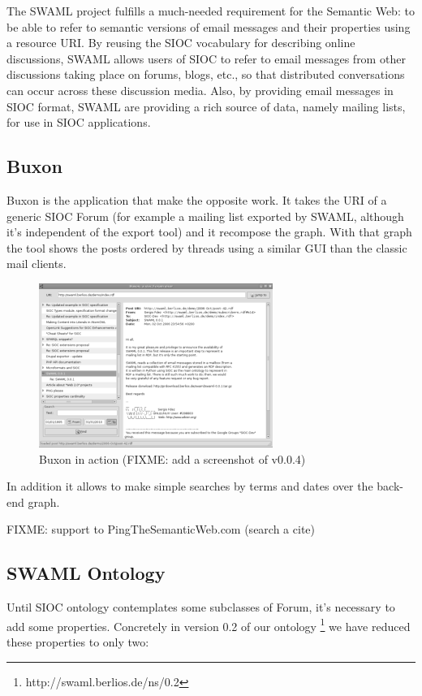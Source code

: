 \documentclass{llncs}
\begin{document}
The SWAML project fulfills a much-needed requirement for the Semantic Web: to be able 
to refer to semantic versions of email messages and their properties using a resource 
URI. By reusing the SIOC vocabulary for describing online discussions, SWAML allows 
users of SIOC to refer to email messages from other discussions taking place on forums, 
blogs, etc., so that distributed conversations can occur across these discussion media. 
Also, by providing email messages in SIOC format, SWAML are providing a rich source of 
data, namely mailing lists, for use in SIOC applications. 

\subsection{Buxon}

Buxon is the application that make the opposite work. It takes the URI of a generic SIOC 
Forum (for example a mailing list exported by SWAML, although it's independent of the 
export tool) and it recompose the graph. With that graph the tool shows the posts ordered 
by threads using a similar GUI than the classic mail clients.

\begin{figure}[ht]
 \centering
 \includegraphics[bb=0 0 288 202]{images/buxon.png}
 \caption{Buxon in action (FIXME: add a screenshot of v0.0.4)}
\end{figure}

In addition it allows to make simple searches by terms and dates over the back-end graph.

FIXME: support to PingTheSemanticWeb.com (search a cite)

\subsection{SWAML Ontology}

Until SIOC ontology contemplates some subclasses of Forum, it's necessary 
to add some properties. Concretely in version 0.2 of our ontology 
\footnote{http://swaml.berlios.de/ns/0.2} we have reduced these properties 
to only two:
\end{document}
